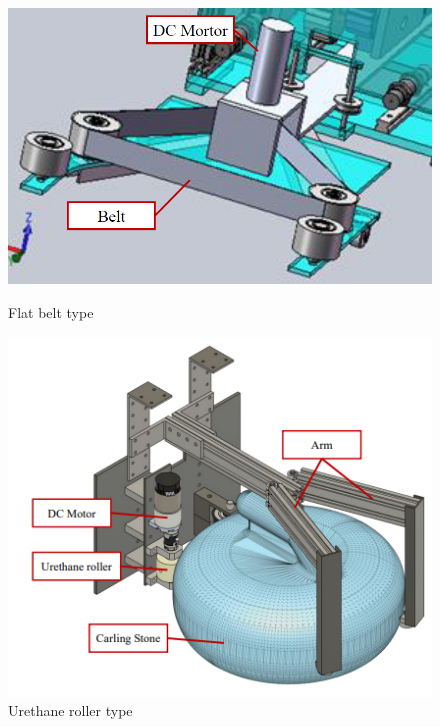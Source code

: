 \documentclass{classes/sice-si}
\begin{document}
\begin{figure}[h]
    \centering
    \vspace{0pt} %
    \begin{minipage}{0.4\linewidth}
        \centering
        \includegraphics[width=\linewidth]{figures/1.png}
        \caption{Flat belt type}
        \label{fig:one}
    \end{minipage}
    \hfill
    \begin{minipage}{0.4\linewidth}
        \centering
        \includegraphics[width=\linewidth]{figures/2.png}
        \caption{Urethane roller type}
        \label{fig:two}
    \end{minipage}
    \begin{minipage}{0.4\linewidth}

\end{minipage}
\end{figure}
\end{document}
